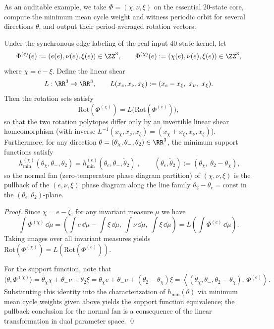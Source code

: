 As an auditable example, we take $\Phi=(\chi,\nu,\xi)$ on the essential 20-state core, compute the minimum mean cycle weight and witness periodic orbit for several directions $\theta$, and output their period-averaged rotation vectors:


\begin{proposition}\label{prop:rotation-polytope-shear}
Under the synchronous edge labeling of the real input 40-state kernel, let
\[
\Phi^{(e)}(e):=(e(e),\nu(e),\xi(e))\in\ZZ^3,
\qquad
\Phi^{(\chi)}(e):=(\chi(e),\nu(e),\xi(e))\in\ZZ^3,
\]
where \(\chi=e-\xi\). Define the linear shear
\[
L:\RR^3\to\RR^3,\qquad L(x_e,x_\nu,x_\xi):=(x_e-x_\xi,\ x_\nu,\ x_\xi).
\]
Then the rotation sets satisfy
\[
\mathrm{Rot}(\Phi^{(\chi)})=L\bigl(\mathrm{Rot}(\Phi^{(e)})\bigr),
\]
so that the two rotation polytopes differ only by an invertible linear shear homeomorphism (with inverse \(L^{-1}(x_\chi,x_\nu,x_\xi)=(x_\chi+x_\xi,x_\nu,x_\xi)\)).
Furthermore, for any direction \(\theta=(\theta_\chi,\theta_-,\theta_2)\in\RR^3\), the minimum support functions satisfy
\[
\boxed{\;
h_{\min}^{(\chi)}(\theta_\chi,\theta_-,\theta_2)
=h_{\min}^{(e)}(\theta_e,\theta_-,\widetilde\theta_2)\;},
\qquad
(\theta_e,\widetilde\theta_2):=(\theta_\chi,\ \theta_2-\theta_\chi),
\]
so the normal fan (zero-temperature phase diagram partition) of \((\chi,\nu,\xi)\) is the pullback of the \((e,\nu,\xi)\) phase diagram along the line family \(\theta_2-\theta_e=\mathrm{const}\) in the \((\theta_e,\theta_2)\)-plane.
\end{proposition}
\begin{proof}
Since \(\chi=e-\xi\), for any invariant measure \(\mu\) we have
\[
\int \Phi^{(\chi)}\,\dd\mu=\left(\int e\,\dd\mu-\int \xi\,\dd\mu,\ \int \nu\,\dd\mu,\ \int \xi\,\dd\mu\right)
=L\left(\int \Phi^{(e)}\,\dd\mu\right).
\]
Taking images over all invariant measures yields \(\mathrm{Rot}(\Phi^{(\chi)})=L(\mathrm{Rot}(\Phi^{(e)}))\).

For the support function, note that
\[
\langle\theta,\Phi^{(\chi)}\rangle
=\theta_\chi\chi+\theta_-\nu+\theta_2\xi
=\theta_\chi e+\theta_-\nu+(\theta_2-\theta_\chi)\xi
=\left\langle(\theta_\chi,\theta_-,\theta_2-\theta_\chi),\,\Phi^{(e)}\right\rangle.
\]
Substituting this identity into the characterization of \(h_{\min}(\theta)\) via minimum mean cycle weights given above yields the support function equivalence; the pullback conclusion for the normal fan is a consequence of the linear transformation in dual parameter space. \qed
\end{proof}

